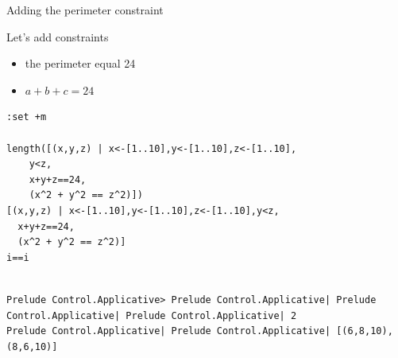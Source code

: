 \documentclass[presetation]{beamer}
\begin{document}
\begin{frame}[fragile,label={sec:orgeadfb4e}]{Adding the perimeter constraint}
 \begin{block}{Let's add constraints}
\begin{itemize}
\item the perimeter equal 24
\item \(a + b + c = 24\)
\end{itemize}

\begin{verbatim}
:set +m

length([(x,y,z) | x<-[1..10],y<-[1..10],z<-[1..10],
	y<z,
	x+y+z==24,
	(x^2 + y^2 == z^2)])
[(x,y,z) | x<-[1..10],y<-[1..10],z<-[1..10],y<z,
  x+y+z==24,
  (x^2 + y^2 == z^2)]
i==i
\end{verbatim}

\begin{verbatim}

Prelude Control.Applicative> Prelude Control.Applicative| Prelude Control.Applicative| Prelude Control.Applicative| 2
Prelude Control.Applicative| Prelude Control.Applicative| [(6,8,10),(8,6,10)]
\end{verbatim}
\end{block}
\end{frame}
\end{document}
